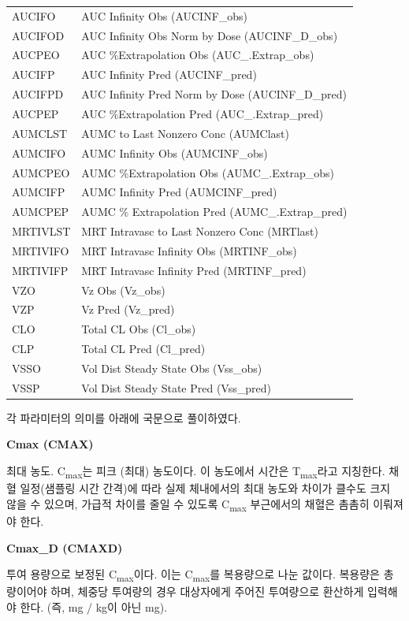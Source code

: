 \documentclass[
  11pt,
  krantz2, a4paper, twoside]{krantz}
\theoremstyle{definition}
\theoremstyle{definition}
\theoremstyle{definition}
\theoremstyle{definition}
\theoremstyle{remark}
\begin{document}
\begin{longtable}[t]{ll}
AUCIFO & AUC Infinity Obs (AUCINF\_obs)\\
AUCIFOD & AUC Infinity Obs Norm by Dose (AUCINF\_D\_obs)\\
\addlinespace
AUCPEO & AUC \%Extrapolation Obs (AUC\_.Extrap\_obs)\\
AUCIFP & AUC Infinity Pred (AUCINF\_pred)\\
AUCIFPD & AUC Infinity Pred Norm by Dose (AUCINF\_D\_pred)\\
AUCPEP & AUC \%Extrapolation Pred (AUC\_.Extrap\_pred)\\
AUMCLST & AUMC to Last Nonzero Conc (AUMClast)\\
\addlinespace
AUMCIFO & AUMC Infinity Obs (AUMCINF\_obs)\\
AUMCPEO & AUMC \%Extrapolation Obs (AUMC\_.Extrap\_obs)\\
AUMCIFP & AUMC Infinity Pred (AUMCINF\_pred)\\
AUMCPEP & AUMC \% Extrapolation Pred (AUMC\_.Extrap\_pred)\\
MRTIVLST & MRT Intravasc to Last Nonzero Conc (MRTlast)\\
\addlinespace
MRTIVIFO & MRT Intravasc Infinity Obs (MRTINF\_obs)\\
MRTIVIFP & MRT Intravasc Infinity Pred (MRTINF\_pred)\\
VZO & Vz Obs (Vz\_obs)\\
VZP & Vz Pred (Vz\_pred)\\
CLO & Total CL Obs (Cl\_obs)\\
\addlinespace
CLP & Total CL Pred (Cl\_pred)\\
VSSO & Vol Dist Steady State Obs (Vss\_obs)\\
VSSP & Vol Dist Steady State Pred (Vss\_pred)\\
\bottomrule
\end{longtable}

각 파라미터의 의미를 아래에 국문으로 풀이하였다.

\textbf{Cmax (CMAX)}

최대 농도. C\textsubscript{max}는 피크 (최대) 농도이다. 이 농도에서 시간은 T\textsubscript{max}라고 지칭한다. 채혈 일정(샘플링 시간 간격)에 따라 실제 체내에서의 최대 농도와 차이가 클수도 크지 않을 수 있으며, 가급적 차이를 줄일 수 있도록 C\textsubscript{max} 부근에서의 채혈은 촘촘히 이뤄져야 한다.

\textbf{Cmax\_D (CMAXD)}

투여 용량으로 보정된 C\textsubscript{max}이다. 이는 C\textsubscript{max}를 복용량으로 나눈 값이다. 복용량은 총량이어야 하며, 체중당 투여량의 경우 대상자에게 주어진 투여량으로 환산하게 입력해야 한다. (즉, mg / kg이 아닌 mg).
\end{document}
